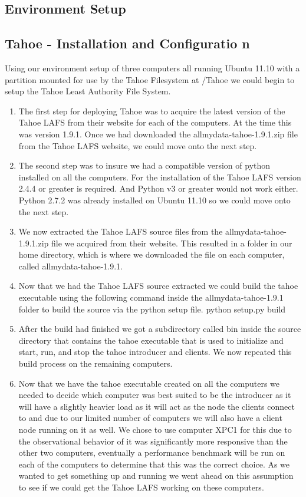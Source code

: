 \documentclass[11pt]{article}
\begin{document}
\subsection{Environment Setup}


\subsection{Tahoe - Installation and Configuratio n}
Using our environment setup of three computers all running Ubuntu 11.10 with a partition mounted for use by the Tahoe Filesystem at /Tahoe we could begin to setup the Tahoe Least Authority File System. 

\begin{enumerate}
\item The first step for deploying Tahoe was to acquire the latest version of the Tahoe LAFS from their website for each of the computers. \cite{tahoe-lafs.org} At the time this was version 1.9.1. Once we had downloaded the allmydata-tahoe-1.9.1.zip file from the Tahoe LAFS website, we could move onto the next step.
\item The second step was to insure we had a compatible version of python installed on all the computers. \cite{python.org} For the installation of the Tahoe LAFS version 2.4.4 or greater is required. And Python v3 or greater would not work either. Python 2.7.2 was already installed on Ubuntu 11.10 so we could move onto the next step.
\item We now extracted the Tahoe LAFS source files from the allmydata-tahoe-1.9.1.zip file we acquired from their website. This resulted in a folder in our home directory, which is where we downloaded the file on each computer, called allmydata-tahoe-1.9.1. 
\item Now that we had the Tahoe LAFS source extracted we could build the tahoe executable using the following command inside the allmydata-tahoe-1.9.1 folder to build the source via the python setup file.
\subitem python setup.py build
\item After the build had finished we got a subdirectory called bin inside the source directory that contains the tahoe executable that is used to initialize and start, run, and stop the tahoe introducer and clients. We now repeated this build process on the remaining computers.
\item Now that we have the tahoe executable created on all the computers we needed to decide which computer was best suited to be the introducer as it will have a slightly heavier load as it will act as the node the clients connect to and due to our limited number of computers we will also have a client node running on it as well. We chose to use computer XPC1 for this due to the observational behavior of it was significantly more responsive than the other two computers, eventually a performance benchmark will be run on each of the computers to determine that this was the correct choice. As we wanted to get something up and running we went ahead on this assumption to see if we could get the Tahoe LAFS working on these computers.

\end{enumerate}
\end{document}
